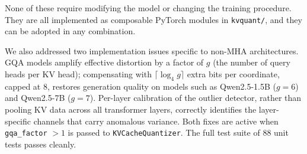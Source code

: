 \documentclass[11pt]{article}
\begin{document}
None of these require modifying the model or changing the training
procedure. They are all implemented as composable PyTorch modules in
\texttt{kvquant/}, and they can be adopted in any combination.

We also addressed two implementation issues specific to non-MHA architectures.
GQA models amplify effective distortion by a factor of $g$ (the number of
query heads per KV head); compensating with $\lceil \log_4 g \rceil$ extra
bits per coordinate, capped at 8, restores generation quality on models such
as Qwen2.5-1.5B ($g=6$) and Qwen2.5-7B ($g=7$). Per-layer calibration of
the outlier detector, rather than pooling KV data across all transformer
layers, correctly identifies the layer-specific channels that carry anomalous
variance. Both fixes are active when \texttt{gqa\_factor} $> 1$ is passed to
\texttt{KVCacheQuantizer}. The full test suite of 88 unit tests passes cleanly.
\end{document}
